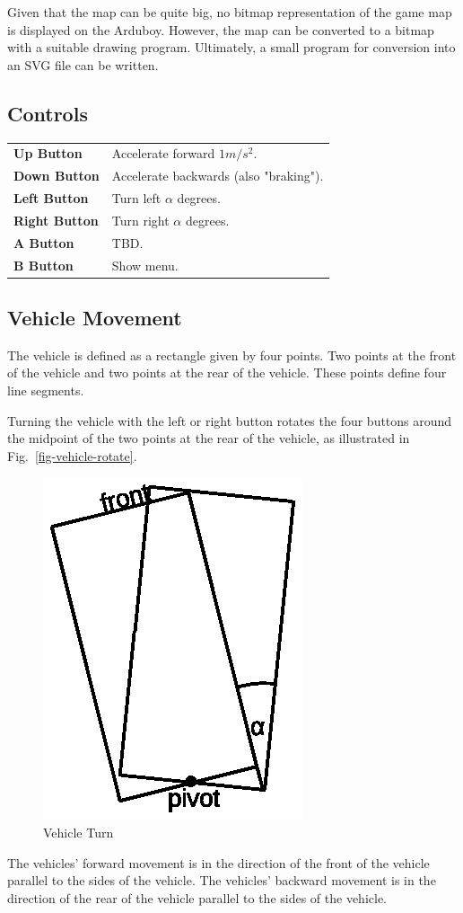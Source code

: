 \documentclass[11pt]{article}
\newcommand{\figref}[1]{Fig.~\eqref{#1}}
\begin{document}
Given that the map can be quite big, no bitmap representation of the game map
is displayed on the Arduboy. However, the map can be converted to a bitmap 
with a suitable drawing program. Ultimately, a small program for conversion
into an SVG file can be written.

\subsection{Controls}
\label{sec-controls}

\begin{tabular}{>{\sffamily\bfseries}ll}
    Up Button & Accelerate forward $1m/s^2$. \\
    Down Button & Accelerate backwards (also "braking").\\
    Left Button & Turn left $\alpha$ degrees.\\
    Right Button & Turn right $\alpha$ degrees.\\
    A Button & TBD.\\
    B Button & Show menu.\\
\end{tabular}

\subsection{Vehicle Movement}
\label{sec-vehicle-movement}

The vehicle is defined as a rectangle given by four points. Two points at the
front of the vehicle and two points at the rear of the vehicle. These points 
define four line segments. 

Turning the vehicle with the left or right button rotates the four buttons 
around the midpoint of the two points at the rear of the vehicle, as
illustrated in \figref{fig-vehicle-rotate}.
\begin{figure}
    \centering
    \includegraphics[trim=0 30 0 30]{vehicle-turn.eps}
    \caption{Vehicle Turn}\label{fig-vehicle-rotate}
\end{figure}
The vehicles' forward movement is in the direction of the front of the vehicle
parallel to the sides of the vehicle. 
The vehicles' backward movement is in the direction of the rear of the vehicle
parallel to the sides of the vehicle. 
\end{document}
